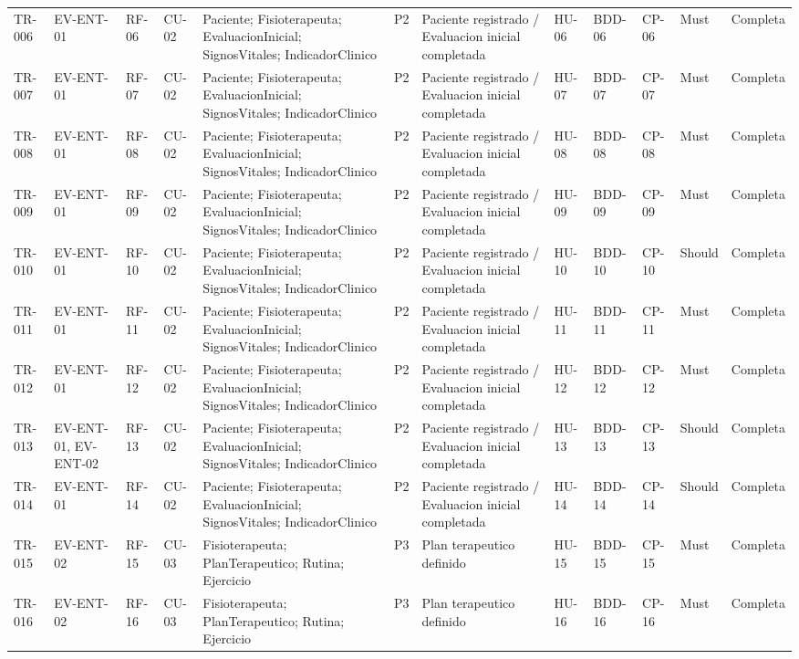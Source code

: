 \documentclass[12pt,a4paper]{article}
\begin{document}
\begin{landscape}
\begin{longtable}{p{0.9cm}p{2.5cm}p{1.7cm}p{1.8cm}p{3.6cm}p{1.6cm}p{3.0cm}p{1.6cm}p{1.8cm}p{1.8cm}p{1.4cm}p{1.5cm}}
TR-006 & EV-ENT-01 & RF-06 & CU-02 & Paciente; Fisioterapeuta; EvaluacionInicial; SignosVitales; IndicadorClinico & P2 & Paciente registrado / Evaluacion inicial completada & HU-06 & BDD-06 & CP-06 & Must & Completa \\
TR-007 & EV-ENT-01 & RF-07 & CU-02 & Paciente; Fisioterapeuta; EvaluacionInicial; SignosVitales; IndicadorClinico & P2 & Paciente registrado / Evaluacion inicial completada & HU-07 & BDD-07 & CP-07 & Must & Completa \\
TR-008 & EV-ENT-01 & RF-08 & CU-02 & Paciente; Fisioterapeuta; EvaluacionInicial; SignosVitales; IndicadorClinico & P2 & Paciente registrado / Evaluacion inicial completada & HU-08 & BDD-08 & CP-08 & Must & Completa \\
TR-009 & EV-ENT-01 & RF-09 & CU-02 & Paciente; Fisioterapeuta; EvaluacionInicial; SignosVitales; IndicadorClinico & P2 & Paciente registrado / Evaluacion inicial completada & HU-09 & BDD-09 & CP-09 & Must & Completa \\
TR-010 & EV-ENT-01 & RF-10 & CU-02 & Paciente; Fisioterapeuta; EvaluacionInicial; SignosVitales; IndicadorClinico & P2 & Paciente registrado / Evaluacion inicial completada & HU-10 & BDD-10 & CP-10 & Should & Completa \\
TR-011 & EV-ENT-01 & RF-11 & CU-02 & Paciente; Fisioterapeuta; EvaluacionInicial; SignosVitales; IndicadorClinico & P2 & Paciente registrado / Evaluacion inicial completada & HU-11 & BDD-11 & CP-11 & Must & Completa \\
TR-012 & EV-ENT-01 & RF-12 & CU-02 & Paciente; Fisioterapeuta; EvaluacionInicial; SignosVitales; IndicadorClinico & P2 & Paciente registrado / Evaluacion inicial completada & HU-12 & BDD-12 & CP-12 & Must & Completa \\
TR-013 & EV-ENT-01, EV-ENT-02 & RF-13 & CU-02 & Paciente; Fisioterapeuta; EvaluacionInicial; SignosVitales; IndicadorClinico & P2 & Paciente registrado / Evaluacion inicial completada & HU-13 & BDD-13 & CP-13 & Should & Completa \\
TR-014 & EV-ENT-01 & RF-14 & CU-02 & Paciente; Fisioterapeuta; EvaluacionInicial; SignosVitales; IndicadorClinico & P2 & Paciente registrado / Evaluacion inicial completada & HU-14 & BDD-14 & CP-14 & Should & Completa \\
TR-015 & EV-ENT-02 & RF-15 & CU-03 & Fisioterapeuta; PlanTerapeutico; Rutina; Ejercicio & P3 & Plan terapeutico definido & HU-15 & BDD-15 & CP-15 & Must & Completa \\
TR-016 & EV-ENT-02 & RF-16 & CU-03 & Fisioterapeuta; PlanTerapeutico; Rutina; Ejercicio & P3 & Plan terapeutico definido & HU-16 & BDD-16 & CP-16 & Must & Completa \\

\end{longtable}
\end{landscape}
\end{document}
